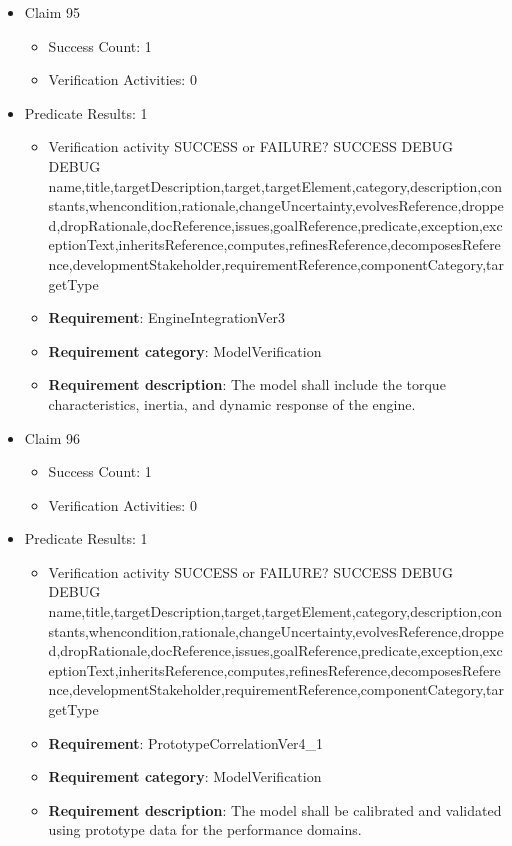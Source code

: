 \documentclass{article}
\begin{document}
\begin{itemize}
  				  \item Claim 95
				\begin{itemize}
			    	\item Success Count: 1 
			    	\item Verification Activities: 0
				\end{itemize}
				
									    
				\item Predicate Results: 1
					\begin{itemize}				
					\item Verification activity SUCCESS or FAILURE? SUCCESS
					DEBUG DEBUG name,title,targetDescription,target,targetElement,category,description,constants,whencondition,rationale,changeUncertainty,evolvesReference,dropped,dropRationale,docReference,issues,goalReference,predicate,exception,exceptionText,inheritsReference,computes,refinesReference,decomposesReference,developmentStakeholder,requirementReference,componentCategory,targetType
					\item \textbf{Requirement}: EngineIntegrationVer3 
					\item \textbf{Requirement category}: ModelVerification
					\item \textbf{Requirement description}: The model shall include the torque characteristics, inertia, and dynamic response of the engine.
					\end{itemize}

  				  \item Claim 96
				\begin{itemize}
			    	\item Success Count: 1 
			    	\item Verification Activities: 0
				\end{itemize}
				
									    
				\item Predicate Results: 1
					\begin{itemize}				
					\item Verification activity SUCCESS or FAILURE? SUCCESS
					DEBUG DEBUG name,title,targetDescription,target,targetElement,category,description,constants,whencondition,rationale,changeUncertainty,evolvesReference,dropped,dropRationale,docReference,issues,goalReference,predicate,exception,exceptionText,inheritsReference,computes,refinesReference,decomposesReference,developmentStakeholder,requirementReference,componentCategory,targetType
					\item \textbf{Requirement}: PrototypeCorrelationVer4_1 
					\item \textbf{Requirement category}: ModelVerification
					\item \textbf{Requirement description}: The model shall be calibrated and validated using prototype data for the performance domains.
					\end{itemize}


\end{itemize}
\end{document}
